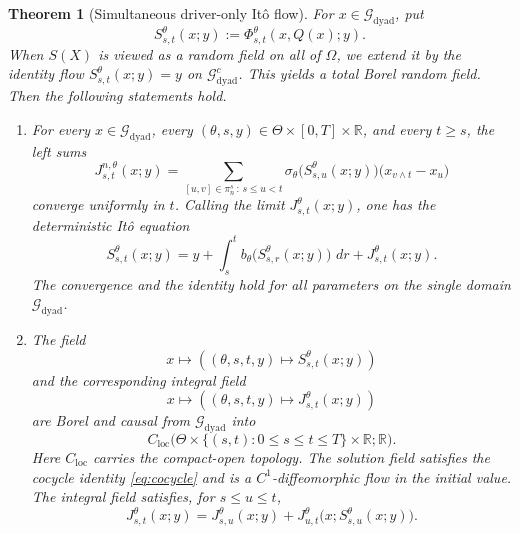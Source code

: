 \documentclass[11pt,reqno]{amsart}
\theoremstyle{plain}
\newtheorem{theorem}{Theorem}[section]
\theoremstyle{definition}
\newcommand{\R}{\mathbb R}
\newcommand{\cG}{\mathcal G}
\newcommand{\dd}{\,d}
\begin{document}
\begin{theorem}[Simultaneous driver-only It\^o flow]
\label{thm:simultaneous-flow}
For \(x\in\cG_{\mathrm{dyad}}\), put
\begin{equation}\label{eq:driver-flow}
  S_{s,t}^\theta(x;y)
  :=\Phi_{s,t}^\theta(x,Q(x);y).
\end{equation}
When \(S(X)\) is viewed as a random field on all of \(\Omega\), we extend it
by the identity flow \(S_{s,t}^\theta(x;y)=y\) on
\(\cG_{\mathrm{dyad}}^c\).  This yields a total Borel random field.
Then the following statements hold.

\begin{enumerate}[label=(\roman*),leftmargin=2.2em]
  \item For every \(x\in\cG_{\mathrm{dyad}}\), every
  \((\theta,s,y)\in\Theta\times[0,T]\times\R\), and every \(t\ge s\),
  the left sums
  \begin{equation}\label{eq:Follmer-sums}
    J_{s,t}^{n,\theta}(x;y)
    =
    \sum_{[u,v]\in\pi_n^s\,:\,s\le u<t}
    \sigma_\theta\bigl(S_{s,u}^\theta(x;y)\bigr)
    \bigl(x_{v\wedge t}-x_u\bigr)
  \end{equation}
  converge uniformly in \(t\).  Calling the limit
  \(J_{s,t}^\theta(x;y)\), one has the deterministic It\^o equation
  \begin{equation}\label{eq:pathwise-sde-flow}
    S_{s,t}^\theta(x;y)
    =y+
    \int_s^t b_\theta\bigl(S_{s,r}^\theta(x;y)\bigr)\,\dd r
    +J_{s,t}^\theta(x;y).
  \end{equation}
  The convergence and the identity hold for all parameters on the single
  domain \(\cG_{\mathrm{dyad}}\).

  \item The field
  \begin{equation}\label{eq:flow-valued-map}
    x\longmapsto
    \left(
      (\theta,s,t,y)\longmapsto S_{s,t}^\theta(x;y)
    \right)
  \end{equation}
  and the corresponding integral field
  \[
    x\longmapsto
    \left(
      (\theta,s,t,y)\longmapsto J_{s,t}^\theta(x;y)
    \right)
  \]
  are Borel and causal from \(\cG_{\mathrm{dyad}}\) into
  \[
    C_{\mathrm{loc}}
    \bigl(\Theta\times\{(s,t):0\le s\le t\le T\}\times\R;\R\bigr).
  \]
  Here \(C_{\mathrm{loc}}\) carries the compact-open topology.
  The solution field satisfies the cocycle identity \eqref{eq:cocycle} and is a
  \(C^1\)-diffeomorphic flow in the initial value.  The integral field
  satisfies, for \(s\le u\le t\),
  \begin{equation}\label{eq:integral-cocycle}
    J_{s,t}^\theta(x;y)
    =J_{s,u}^\theta(x;y)
     +J_{u,t}^\theta
       \bigl(x;S_{s,u}^\theta(x;y)\bigr).
  \end{equation}


\end{enumerate}
\end{theorem}
\end{document}
